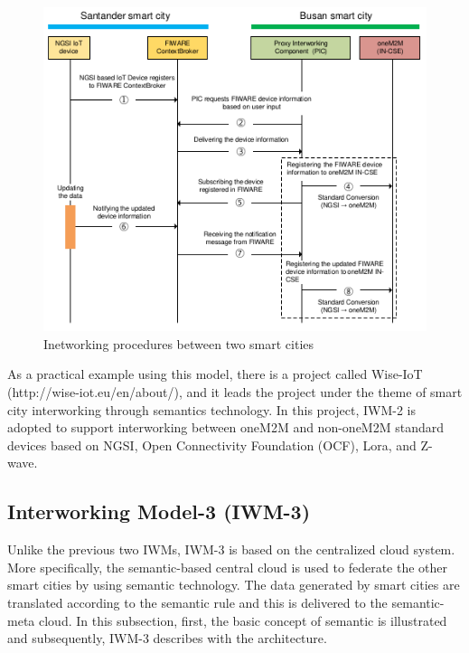 \begin{figure}[H]			%
	\centering
	\includegraphics[width=\textwidth]{figures/fig_proxy_interworking_procedures.pdf}
    \caption{Inetworking procedures between two smart cities}
    \label{fig:interworking_procedures_iwm2}
\end{figure}

As a practical example using this model, there is a project called Wise-IoT (http://wise-iot.eu/en/about/), and it leads the project under the theme of smart city interworking through semantics technology. In this project, IWM-2 is adopted to support interworking between oneM2M and non-oneM2M standard devices based on NGSI, Open Connectivity Foundation (OCF), Lora, and Z-wave.

\subsection{Interworking Model-3 (IWM-3)}
Unlike the previous two IWMs, IWM-3 is based on the centralized cloud system. More specifically, the semantic-based central cloud is used to federate the other smart cities by using semantic technology. The data generated by smart cities are translated according to the semantic rule and this is delivered to the semantic-meta cloud. In this subsection, first, the basic concept of semantic is illustrated and subsequently, IWM-3 describes with the architecture.

